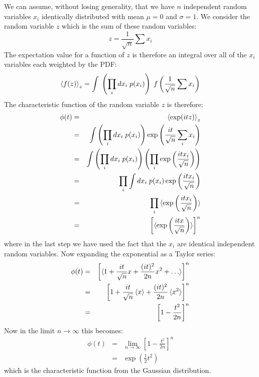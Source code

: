 \documentclass[12pt]{article}
\begin{document}
We can assume, without losing generality, that we have $n$ independent random variables $x_i$ identically distributed with mean $\mu=0$ and $\sigma=1$.  We consider the random variable $z$ which is the sum of these random variables:
\begin{displaymath}
z = \frac{1}{\sqrt{n}}\sum x_i 
\end{displaymath}
The expectation value for a function of $z$ is therefore an integral over all of the $x_i$ variables each weighted by the PDF:
\begin{equation}
\braket{f(z)}_z = \int \; \left( \prod_i dx_i \; p(x_i) \right) \; f\left( \frac{1}{\sqrt{n}}\sum x_i \right) 
\end{equation} 
 The characteristic function of the random variable $z$ is therefore:
\begin{eqnarray*}
\phi(t) &=& \braket{\exp(itz)}_z \\
           &=& \int \left( \prod_i dx_i \; p(x_i) \right)  \exp\left( \frac{it}{\sqrt{n}}\sum_i x_i \right) \\
           &=& \int \left( \prod_i dx_i \; p(x_i) \right)  \left( \prod_i \exp\left(\frac{itx_i}{\sqrt{n}}\right) \right)\\           
           &=& \prod_i \int dx_i \; p(x_i) \exp\left(\frac{itx_i}{\sqrt{n}}\right) \\                      
           &=& \prod_i \braket{\exp\left(\frac{itx_i}{\sqrt{n}}\right)} \\
           &=& \left[\braket{\exp\left(\frac{itx}{\sqrt{n}}\right)}\right]^n
\end{eqnarray*}
where in the last step we have used the fact that the $x_i$ are identical independent random variables.  Now expanding the exponential as a Taylor series:
\begin{eqnarray*}
\phi(t) &=& \left[\braket{1 + \frac{it}{\sqrt{n}}x+\frac{(it)^2}{2n}x^2+\ldots}\right]^n\\
&=& \left[1 + \frac{it}{\sqrt{n}}\braket{x}+\frac{(it)^2}{2n}\braket{x^2}\right]^n \\
&=& \left[1 -\frac{t^2}{2n}\right]^n
\end{eqnarray*}
 Now in the limit $n \to \infty$ this becomes:
\begin{eqnarray*}
\phi(t) &=& \lim_{n \to \infty} \left[1 -\frac{t^2}{2n}\right]^n \\
          &=& \exp\left( \frac{1}{2}t^2\right)
\end{eqnarray*}
which is the characteristic function from the Gaussian distribution.
\end{document}
